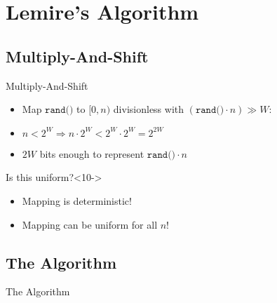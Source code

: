 \section{Lemire's Algorithm}

\subsection{Multiply-And-Shift}\label{sec:3.1}
\begin{frame}{Multiply-And-Shift}
    \pause 
    \begin{itemize}
        \item Map $\texttt{rand()}$ to $[0,n)$ divisionless with $(\texttt{rand()} \cdot n) \gg W$:
        \only<5>{\begin{align*}\large
            (\underbrace{\texttt{rand()}}_{{} \in [0,2^W)} \cdot n) \div 2^W  
        \end{align*}}
        \only<6-8>{\begin{align*}\large
            \underbrace{(\texttt{rand()} \cdot n)}_{{} \in [0,n \cdot 2^W)} \div 2^W  
        \end{align*}}
        \only<9->{\begin{align*}\large
            \underbrace{(\texttt{rand()} \cdot n) \div 2^W}_{{} \in [0,n)}
        \end{align*}}
        \item<7-> $n < 2^W \Longrightarrow n \cdot 2^W < 2^W \cdot 2^W = 2^{2W}$
        \item<8-> $2W$ bits enough to represent $\texttt{rand()} \cdot n$  
    \end{itemize}
    \vspace*{0.5cm}
    \begin{block}{Is this uniform?}<10->
        \begin{itemize}
            \item<11-> Mapping is deterministic!
            \item<12-> Mapping can  be uniform for all $n$!
        \end{itemize}
    \end{block}
\end{frame}

\subsection{The Algorithm}\label{sec:3.2}
\begin{frame}{The Algorithm}
    \pause 
    

\end{frame}